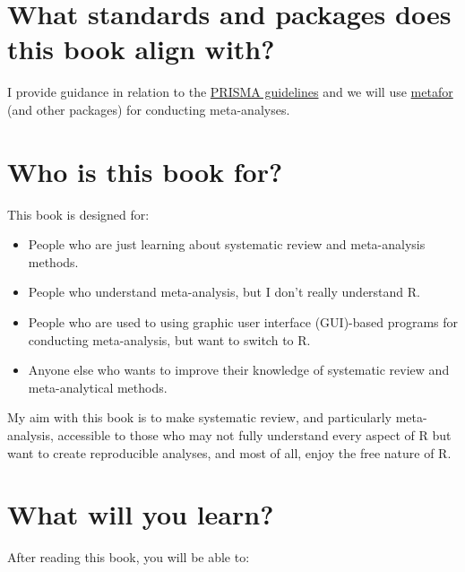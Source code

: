 \documentclass[
]{book}
\begin{document}
\hypertarget{what-standards-and-packages-does-this-book-align-with}{%
\section*{What standards and packages does this book align with?}\label{what-standards-and-packages-does-this-book-align-with}}

I provide guidance in relation to the \href{http://www.prisma-statement.org/}{PRISMA guidelines} \citep{page2021} and we will use \href{http://www.metafor-project.org/doku.php/metafor}{metafor} \citep{viechtbauer2010} (and other packages) for conducting meta-analyses.

\hypertarget{who-is-this-book-for}{%
\section*{Who is this book for?}\label{who-is-this-book-for}}

This book is designed for:

\begin{itemize}
\item
  People who are just learning about systematic review and meta-analysis methods.
\item
  People who understand meta-analysis, but I don't really understand R.
\item
  People who are used to using graphic user interface (GUI)-based programs for conducting meta-analysis, but want to switch to R.
\item
  Anyone else who wants to improve their knowledge of systematic review and meta-analytical methods.
\end{itemize}

My aim with this book is to make systematic review, and particularly meta-analysis, accessible to those who may not fully understand every aspect of R but want to create reproducible analyses, and most of all, enjoy the free nature of R.

\hypertarget{what-will-you-learn}{%
\section*{What will you learn?}\label{what-will-you-learn}}

After reading this book, you will be able to:
\end{document}
